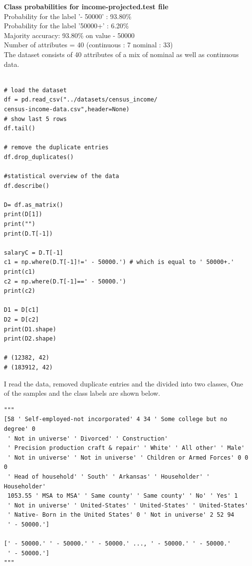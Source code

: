 \documentclass[10pt,a4paper]{article}
\begin{document}
 \textbf{Class probabilities for income-projected.test file}\\
 Probability for the label '- 50000' : 93.80\%\\
 Probability for the label '50000+' : 6.20\%\\
 Majority accuracy: 93.80\% on value - 50000\\
 Number of attributes = 40 (continuous : 7 nominal : 33)\\
 
The dataset consists of 40 attributes of a mix of nominal as well as continuous data.

\lstset{%
basicstyle=\small, %
identifierstyle=, %
stringstyle=\ttfamily, %
showstringspaces=false} %

\lstset{language=Python}          %

\begin{lstlisting}[label=census-data,caption=loadDataprocess]  % Start your code-block

# load the dataset 
df = pd.read_csv("../datasets/census_income/
census-income-data.csv",header=None)
# show last 5 rows
df.tail()

# remove the duplicate entries
df.drop_duplicates()  

#statistical overview of the data
df.describe()

D= df.as_matrix()
print(D[1])
print("")
print(D.T[-1])

salaryC = D.T[-1]
c1 = np.where(D.T[-1]!=' - 50000.') # which is equal to ' 50000+.'
print(c1)
c2 = np.where(D.T[-1]==' - 50000.')
print(c2)

D1 = D[c1]
D2 = D[c2]
print(D1.shape)
print(D2.shape)

# (12382, 42)
# (183912, 42)
\end{lstlisting}

I read the data, removed duplicate entries and the divided into two classes, One of the samples and the class labels are shown below. 
\begin{verbatim}
"""
[58 ' Self-employed-not incorporated' 4 34 ' Some college but no degree' 0
 ' Not in universe' ' Divorced' ' Construction'
 ' Precision production craft & repair' ' White' ' All other' ' Male'
 ' Not in universe' ' Not in universe' ' Children or Armed Forces' 0 0 0
 ' Head of household' ' South' ' Arkansas' ' Householder' ' Householder'
 1053.55 ' MSA to MSA' ' Same county' ' Same county' ' No' ' Yes' 1
 ' Not in universe' ' United-States' ' United-States' ' United-States'
 ' Native- Born in the United States' 0 ' Not in universe' 2 52 94
 ' - 50000.']

[' - 50000.' ' - 50000.' ' - 50000.' ..., ' - 50000.' ' - 50000.'
 ' - 50000.']
"""
\end{verbatim}
\end{document}
